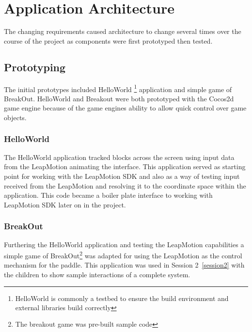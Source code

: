 
\chapter{Application Architecture} %

\label{Chapter4} %


The changing requirements caused architecture to change several times over the course of the project as components were first prototyped then tested. 

\section{Prototyping}

The initial prototypes included HelloWorld \footnote{HelloWorld is commonly a testbed to ensure the build environment and external libraries build correctly} application and simple game of BreakOut. HelloWorld and Breakout were both prototyped with the Cocos2d game engine because of the game engines ability to allow quick control over game objects. \cite{cocos2d} 


\subsection{HelloWorld}\label{HelloWorld_prototype}
The HelloWorld application tracked blocks across the screen using input data from the LeapMotion animating the interface. This application served as starting point for working with the LeapMotion SDK and also as a way of testing input received from the LeapMotion and resolving it to the coordinate space within the application. This code became a boiler plate interface to working with LeapMotion SDK later on in the project. 

\subsection{BreakOut}\label{breakout_prototype}
Furthering the HelloWorld application and testing the LeapMotion capabilities a simple game of BreakOut\footnote{The breakout game was pre-built sample code\cite{breakout}} was adapted for using the LeapMotion as the control mechanism for the paddle. This application was used in Session 2~\ref{session2} with the children to show sample interactions of a complete system. 

